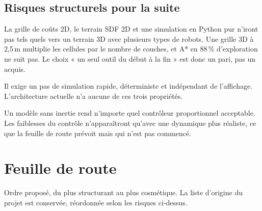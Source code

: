 \documentclass[11pt,a4paper]{article}
\begin{document}
\subsection{Risques structurels pour la suite}
\begin{description}[leftmargin=0cm,style=nextline]
\item[Passage à l'échelle (multi-robots, 3D).] La grille de coûts 2D, le terrain SDF 2D et une simulation en Python pur
n'iront pas tels quels vers un terrain 3D avec plusieurs types de robots. Une grille 3D à 2,5\,m multiplie les cellules par le nombre de couches, et A* en 88\,\% d'exploration
ne suit pas. Le choix « un seul outil du début à la fin » est donc un pari, pas un acquis.
\item[Apprentissage par renforcement.] Il exige un pas de simulation rapide, déterministe et indépendant de l'affichage.
L'architecture actuelle n'a aucune de ces trois propriétés.
\item[Réalisme.] Un modèle sans inertie rend n'importe quel contrôleur proportionnel acceptable. Les faiblesses du contrôle n'apparaîtront
qu'avec une dynamique plus réaliste, ce que la feuille de route prévoit mais qui n'est pas commencé.
\end{description}

\section{Feuille de route}
\label{sec:roadmap}
Ordre proposé, du plus structurant au plus cosmétique. La liste d'origine du projet est conservée, réordonnée selon les risques ci-dessus.
\end{document}
